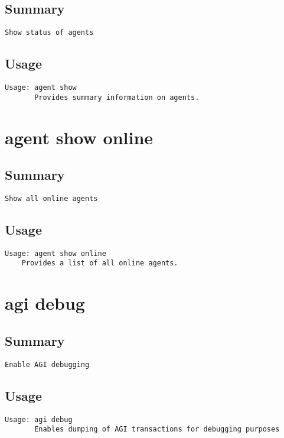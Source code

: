 \subsection{Summary}
\begin{verbatim}
Show status of agents
\end{verbatim}
\subsection{Usage}
\begin{verbatim}
Usage: agent show
       Provides summary information on agents.

\end{verbatim}


\section{agent show online}
\subsection{Summary}
\begin{verbatim}
Show all online agents
\end{verbatim}
\subsection{Usage}
\begin{verbatim}
Usage: agent show online
	Provides a list of all online agents.

\end{verbatim}


\section{agi debug}
\subsection{Summary}
\begin{verbatim}
Enable AGI debugging
\end{verbatim}
\subsection{Usage}
\begin{verbatim}
Usage: agi debug
       Enables dumping of AGI transactions for debugging purposes

\end{verbatim}


